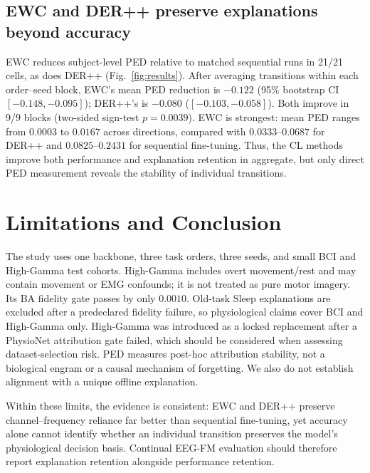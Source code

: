 \documentclass[conference]{IEEEtran}
\begin{document}
\subsection{EWC and DER++ preserve explanations beyond accuracy}
EWC reduces subject-level PED relative to matched sequential runs in 21/21
cells, as does DER++ (Fig.~\ref{fig:results}). After averaging transitions
within each order--seed block, EWC's mean PED reduction is $-0.122$ (95\%
bootstrap CI $[-0.148,-0.095]$); DER++'s is $-0.080$
($[-0.103,-0.058]$). Both improve in 9/9 blocks (two-sided sign-test
$p=0.0039$). EWC is strongest: mean PED ranges from $0.0003$ to $0.0167$
across directions, compared with $0.0333$--$0.0687$ for DER++ and
$0.0825$--$0.2431$ for sequential fine-tuning. Thus, the CL methods improve
both performance and explanation retention in aggregate, but only direct PED
measurement reveals the stability of individual transitions.

\section{Limitations and Conclusion}
The study uses one backbone, three task orders, three seeds, and small BCI and
High-Gamma test cohorts. High-Gamma includes overt movement/rest and may contain
movement or EMG confounds; it is not treated as pure motor imagery. Its BA
fidelity gate passes by only $0.0010$. Old-task Sleep explanations are excluded
after a predeclared fidelity failure, so physiological claims cover BCI and
High-Gamma only. High-Gamma was introduced as a locked replacement after a
PhysioNet attribution gate failed, which should be considered when assessing
dataset-selection risk. PED measures post-hoc attribution stability, not a
biological engram or a causal mechanism of forgetting. We also do not establish
alignment with a unique offline explanation.

Within these limits, the evidence is consistent: EWC and DER++ preserve
channel--frequency reliance far better than sequential fine-tuning, yet accuracy
alone cannot identify whether an individual transition preserves the model's
physiological decision basis. Continual EEG-FM evaluation should therefore
report explanation retention alongside performance retention.

\clearpage


\end{document}
